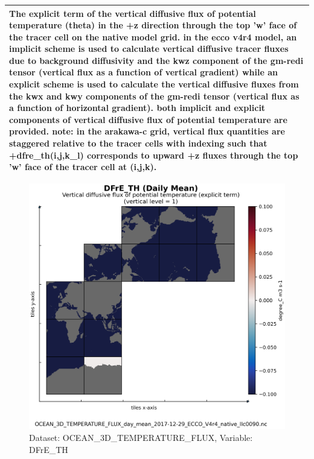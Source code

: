 \begin{longtable}{|m{}|m{}|m{}|m{}|}
\multicolumn{4}{|p{1\textwidth}|}{\footnotesize{{The explicit term of the vertical diffusive flux of potential temperature (theta) in the +z direction through the top 'w' face of the tracer cell on the native model grid. in the ecco v4r4 model, an implicit scheme is used to calculate vertical diffusive tracer fluxes due to background diffusivity and the kwz component of the gm-redi tensor (vertical flux as a function of vertical gradient) while an explicit scheme is used to calculate the vertical diffusive fluxes from the kwx and kwy components of the gm-redi tensor (vertical flux as a function of horizontal gradient). both implicit and explicit components of vertical diffusive flux of potential temperature are provided. note: in the arakawa-c grid, vertical flux quantities are staggered relative to the tracer cells with indexing such that +dfre\_th(i,j,k\_l) corresponds to upward +z fluxes through the top 'w' face of the tracer cell at (i,j,k).}}} \\ \hline
\end{longtable}

\begin{figure}[H]
\centering
\includegraphics[scale=0.55]{../images/plots/native_plots/Ocean_Three-Dimensional_Potential_Temperature_Fluxes/DFrE_TH.png}
\caption{Dataset: OCEAN\_3D\_TEMPERATURE\_FLUX, Variable: DFrE\_TH}
\label{tab:table-OCEAN_3D_TEMPERATURE_FLUX_DFrE_TH-Plot}
\end{figure}
\newpage
\pagebreak
